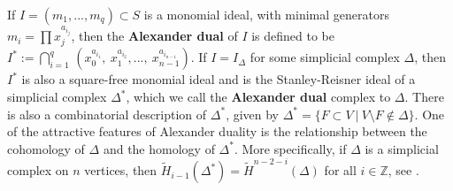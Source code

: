 \documentclass[12pt,leqno]{amsart}
\newtheorem{theorem}[lemma]{Theorem}
\theoremstyle{definition}
\begin{document}
If $I = (m_1,...,m_q) \subset S$ is a monomial ideal, with minimal generators $m_i = \displaystyle \prod x_j^{a_{i_j}}$, then the \textbf{Alexander dual} of $I$ is defined to be $\displaystyle I^* := \bigcap_{i=1}^q\hspace{2pt} (x_0^{a_{i_1}},\ x_1^{a_{i_2}},...,\ x_{n-1}^{a_{i_{n-1}}})$. If $I = I_\Delta$ for some simplicial complex $\Delta$, then $I^*$ is also a square-free monomial ideal and is the Stanley-Reisner ideal of a simplicial complex $\Delta^*$, which we call the \textbf{Alexander dual} complex to $\Delta$. There is also a combinatorial description of $\Delta^*$, given by $\Delta^* = \{ F \subset V \ | \ V \setminus F \not \in \Delta \}$. One of the attractive features of Alexander duality is the relationship between the cohomology of $\Delta$ and the homology of $\Delta^*$. More specifically, if $\Delta$ is a simplicial complex on $n$ vertices, then $    \widetilde{H}_{i-1}(\Delta^*) = \widetilde{H}^{n-2-i}(\Delta)$ for all $i \in \mathbb Z$, see \cite[Theorem 5.6]{MS}.
%
%
\end{document}
